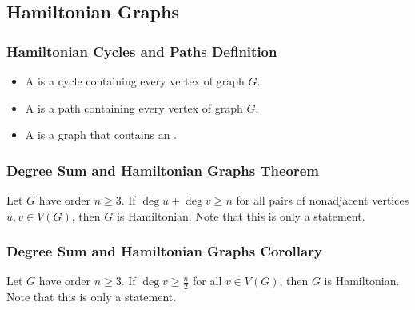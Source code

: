 \subsection{Hamiltonian Graphs}

\subsubsection*{Hamiltonian Cycles and Paths Definition}
\begin{itemize}
    \item A  is a cycle containing every vertex of graph $G$.
    \item A  is a path containing every vertex of graph $G$.
    \item A  is a graph that contains an .
\end{itemize}

\subsubsection*{Degree Sum and Hamiltonian Graphs Theorem}
Let $G$ have order $n \geq 3$. If $\deg u + \deg v \geq n$ for all pairs of nonadjacent vertices $u,v \in V(G)$, then $G$ is Hamiltonian. Note that this is only a  statement.

\subsubsection*{Degree Sum and Hamiltonian Graphs Corollary}
Let $G$ have order $n \geq 3$. If $\deg v \geq \frac{n}{2}$ for all $v \in V(G)$, then $G$ is Hamiltonian. Note that this is only a  statement.